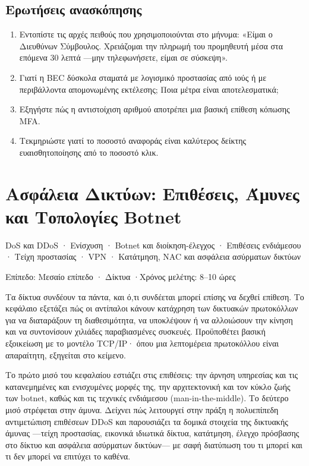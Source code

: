 \documentclass[11pt,openany]{book}
\newcommand{\chaptermeta}[3]{%
  {\sffamily\small\color{accent}#1\par}\vspace{0.3em}
  {\sffamily\footnotesize\color{gray}#2 \quad·\quad #3\par}\vspace{1.2em}}
\begin{document}
\section*{Ερωτήσεις ανασκόπησης}
\begin{enumerate}
  \item Εντοπίστε τις αρχές πειθούς που χρησιμοποιούνται στο μήνυμα: «Είμαι ο Διευθύνων Σύμβουλος. Χρειάζομαι την πληρωμή του προμηθευτή μέσα στα επόμενα 30 λεπτά —μην τηλεφωνήσετε, είμαι σε σύσκεψη».
  \item Γιατί η BEC δύσκολα σταματά με λογισμικό προστασίας από ιούς ή με περιβάλλοντα απομονωμένης εκτέλεσης; Ποια μέτρα είναι αποτελεσματικά;
  \item Εξηγήστε πώς η αντιστοίχιση αριθμού αποτρέπει μια βασική επίθεση κόπωσης MFA.
  \item Τεκμηριώστε γιατί το ποσοστό αναφοράς είναι καλύτερος δείκτης ευαισθητοποίησης από το ποσοστό κλικ.
\end{enumerate}

\chapter{Ασφάλεια Δικτύων: Επιθέσεις, Άμυνες και Τοπολογίες Botnet}\label{ch:6}
\chaptermeta{DoS και DDoS · Ενίσχυση · Botnet και διοίκηση-έλεγχος · Επιθέσεις ενδιάμεσου · Τείχη προστασίας · VPN · Κατάτμηση, NAC και ασφάλεια ασύρματων δικτύων}{Επίπεδο: Μεσαίο επίπεδο · Δίκτυα}{Χρόνος μελέτης: 8–10 ώρες}

Τα δίκτυα συνδέουν τα πάντα, και ό,τι συνδέεται μπορεί επίσης να δεχθεί επίθεση. Το κεφάλαιο εξετάζει πώς οι αντίπαλοι κάνουν κατάχρηση των δικτυακών πρωτοκόλλων για να διαταράξουν τη διαθεσιμότητα, να υποκλέψουν ή να αλλοιώσουν την κίνηση και να συντονίσουν χιλιάδες παραβιασμένες συσκευές. Προϋποθέτει βασική εξοικείωση με το μοντέλο TCP/IP· όπου μια λεπτομέρεια πρωτοκόλλου είναι απαραίτητη, εξηγείται στο κείμενο.

Το πρώτο μισό του κεφαλαίου εστιάζει στις επιθέσεις: την άρνηση υπηρεσίας και τις κατανεμημένες και ενισχυμένες μορφές της, την αρχιτεκτονική και τον κύκλο ζωής των botnet, καθώς και τις τεχνικές ενδιάμεσου (man-in-the-middle). Το δεύτερο μισό στρέφεται στην άμυνα. Δείχνει πώς λειτουργεί στην πράξη η πολυεπίπεδη αντιμετώπιση επιθέσεων DDoS και παρουσιάζει τα δομικά στοιχεία της δικτυακής άμυνας —τείχη προστασίας, εικονικά ιδιωτικά δίκτυα, κατάτμηση, έλεγχο πρόσβασης στο δίκτυο και ασφάλεια ασύρματων δικτύων— με σαφή διατύπωση του τι μπορεί και τι δεν μπορεί να επιτύχει το καθένα.
\end{document}
